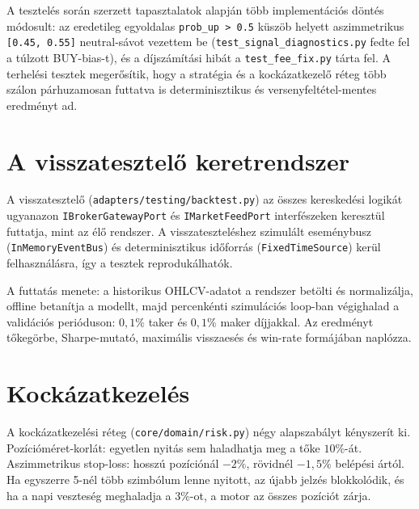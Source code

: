 A tesztelés során szerzett tapasztalatok alapján több implementációs
döntés módosult: az eredetileg egyoldalas \texttt{prob\_up > 0.5}
küszöb helyett aszimmetrikus \texttt{[0.45, 0.55]} neutral-sávot
vezettem be (\texttt{test\_signal\_diagnostics.py} fedte fel a
túlzott BUY-bias-t), és a díjszámítási hibát a
\texttt{test\_fee\_fix.py} tárta fel.
A terhelési tesztek megerősítik, hogy a stratégia és a kockázatkezelő
réteg több szálon párhuzamosan futtatva is determinisztikus és
versenyfeltétel-mentes eredményt ad.

\section{A visszatesztelő keretrendszer}
\label{sec:backtest}

A visszatesztelő (\texttt{adapters/testing/backtest.py}) az összes
kereskedési logikát ugyanazon \texttt{IBrokerGatewayPort} és
\texttt{IMarketFeedPort} interfészeken keresztül futtatja, mint az élő rendszer.
A visszateszteléshez szimulált eseménybusz (\texttt{InMemoryEventBus}) és
determinisztikus időforrás (\texttt{FixedTimeSource}) kerül felhasználásra,
így a tesztek reprodukálhatók.

A futtatás menete: a historikus OHLCV-adatot a rendszer betölti és normalizálja,
offline betanítja a modellt, majd percenkénti szimulációs loop-ban végighalad
a validációs perióduson: $0{,}1\%$ taker és $0{,}1\%$ maker díjjakkal.
Az eredményt tőkegörbe, Sharpe-mutató, maximális visszaesés és win-rate
formájában naplózza.



\section{Kockázatkezelés}
\label{sec:risk_management}

A kockázatkezelési réteg (\texttt{core/domain/risk.py}) négy alapszabályt
kényszerít ki. Pozícióméret-korlát: egyetlen nyitás sem haladhatja meg a tőke
$10\%$-át. Aszimmetrikus stop-loss: hosszú pozíciónál $-2\%$, rövidnél
$-1{,}5\%$ belépési ártól. Ha egyszerre 5-nél több szimbólum lenne nyitott,
az újabb jelzés blokkolódik, és ha a napi veszteség meghaladja a $3\%$-ot,
a motor az összes pozíciót zárja.

